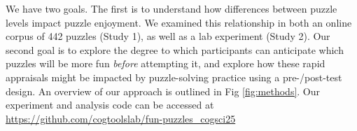 \documentclass[10pt,letterpaper]{article}
\begin{document}
We have two goals. The first is to understand how differences between puzzle levels impact puzzle enjoyment. We examined this relationship in both an online corpus of 442 puzzles (Study 1), as well as a lab experiment (Study 2). Our second goal is to explore the degree to which participants can anticipate which puzzles will be more fun \textit{before} attempting it, and explore how these rapid appraisals might be impacted by puzzle-solving practice using a pre-/post-test design. An overview of our approach is outlined in Fig \ref{fig:methods}. Our experiment and analysis code can be accessed at 
\url{https://github.com/cogtoolslab/fun-puzzles_cogsci25}



% 

\end{document}
